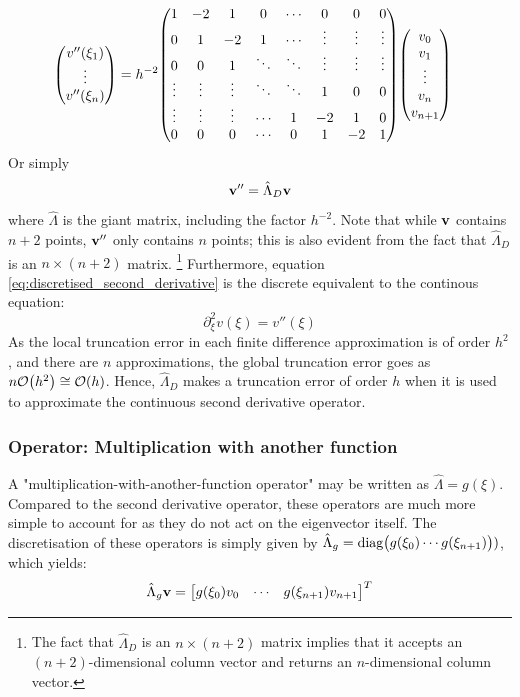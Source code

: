 \documentclass[reprint,english]{revtex4-1}
\begin{document}
\begin{align*}
\mqty(v''(\xi_1)\\\vdots\\v''(\xi_n)) &= h^{-2}
\mqty(1      & -2      & 1       & 0      & \cdots &  0       & 0        & 0      \\
      0      &  1      & -2      & 1      & \cdots &  \vdots  & \vdots   & \vdots \\
      0      &  0      & 1       & \ddots & \ddots &  \vdots  & \vdots   & \vdots \\
      \vdots &  \vdots & \vdots  & \ddots & \ddots &  1       &  0       & 0      \\
      \vdots &  \vdots & \vdots  & \cdots & 1      & -2       &  1       & 0      \\
      0      &  0      & 0       & \cdots & 0      & 1        &  -2      & 1       )
\mqty(v_0\\v_1\\\vdots\\v_n\\v_{n+1})
\end{align*}
Or simply
\begin{equation}\label{eq:discretised_second_derivative}
\vb{v}''=\hat{\Lambda}_D\vb{v}
\end{equation}
where \(\hat{\Lambda}\) is the giant matrix, including the factor \(h^{-2}\). Note that while \(\vb{v}\) contains \(n+2\) points, \(\vb{v}''\) only contains \(n\) points; this is also evident from the fact that \(\hat{\Lambda}_D\) is an \(n\times(n+2)\) matrix. \footnote{The fact that \(\hat{\Lambda}_D\) is an \(n\times(n+2)\) matrix implies that it accepts an \((n+2)\)-dimensional column vector and returns an \(n\)-dimensional column vector.} Furthermore, equation \eqref{eq:discretised_second_derivative} is the discrete equivalent to the continous equation:
\[\partial_\xi^2v(\xi)=v''(\xi)\]
As the local truncation error in each finite difference approximation is of order \(h^2\), and there are \(n\) approximations, the global truncation error goes as \(n\order{h^2}\cong \order{h}\). Hence, \(\hat{\Lambda}_D\) makes a truncation error of order \(h\) when it is used to approximate the continuous second derivative operator.
\subsubsection{Operator: Multiplication with another function}
A "multiplication-with-another-function operator" may be written as \(\hat{\Lambda}=g(\xi)\). Compared to the second derivative operator, these operators are much more simple to account for as they do not act on the eigenvector itself. The discretisation of these operators is simply given by \(\hat{\Lambda}_g=\text{diag}\mqty(g(\xi_0)\cdots g(\xi_{n+1})))\), which yields:
\begin{equation}
\hat{\Lambda}_g\vb{v}=\mqty[g(\xi_0)v_0 & \cdots & g(\xi_{n+1})v_{n+1}]^T
\end{equation}
\end{document}
